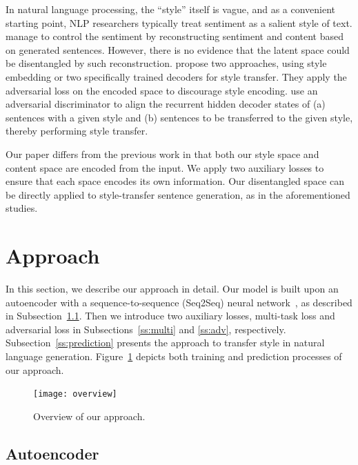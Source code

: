 \documentclass[11pt,a4paper]{article}
\begin{document}
In natural language processing, the ``style'' itself is vague, and as a convenient starting point, NLP researchers typically treat sentiment as a salient style of text.  manage to control the sentiment by reconstructing sentiment and content based on generated sentences. However, there is no evidence that the latent space could be disentangled by such reconstruction.  propose two approaches, using style embedding or two specifically trained decoders for style transfer. They apply the adversarial loss on the encoded space to discourage style encoding.  use an adversarial discriminator to align the recurrent hidden decoder states of (a) sentences with a given style and (b) sentences to be transferred to the given style, thereby performing style transfer.

Our paper differs from the previous work in that both our style space and content space are encoded from the input. We apply two auxiliary losses to ensure that each space encodes its own information. Our disentangled space can be directly applied to style-transfer sentence generation, as in the aforementioned studies.

\section{Approach}

In this section, we describe our approach in detail. Our model is built upon an autoencoder with a sequence-to-sequence (Seq2Seq) neural network~\cite{sutskever2014sequence}, as described in Subsection~\ref{ss:seq2seq}. Then we introduce two auxiliary losses, multi-task loss and adversarial loss in Subsections~\ref{ss:multi} and \ref{ss:adv}, respectively. Subsection~\ref{ss:prediction} presents the approach to transfer style in natural language generation. Figure~\ref{fig:model-overview} depicts both training and prediction processes of our approach.


\begin{figure}[ht]
	\centering
	\texttt{[image: overview]}
	\vspace{-.5cm}
	\caption{Overview of our approach.}
	\label{fig:model-overview}
	\vspace{-.3cm}
\end{figure}

\subsection{Autoencoder}\label{ss:seq2seq}
\end{document}
